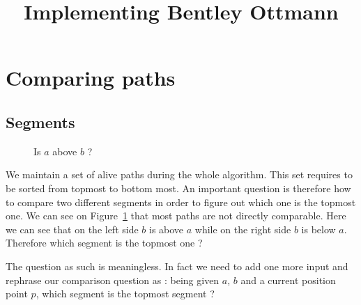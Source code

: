 \documentclass[a4paper, 11pt]{article}
\title{Implementing Bentley Ottmann}
\begin{document}
\maketitle
\section{Comparing paths}
\subsection{Segments}
\begin{figure}[htbp]
  \begin{center}
  \end{center}
  \caption{Is $a$ above $b$ ?}
  \label{fig:above}
\end{figure}

We maintain a set of alive paths during the whole algorithm.
This set requires to be sorted from topmost to bottom most.
An important question is therefore how to compare two different segments in order to
figure out which one is the topmost one.
We can see on Figure~\ref{fig:above} that most paths are not directly comparable.
Here we can see that on the left side $b$ is above $a$ while on the right side
$b$ is below $a$. Therefore which segment is the topmost one ?

The question as such is meaningless. In fact we need to add one more input and rephrase our
comparison question as : being given $a$, $b$ and a current position point $p$, which segment is
the topmost segment ?
\end{document}
